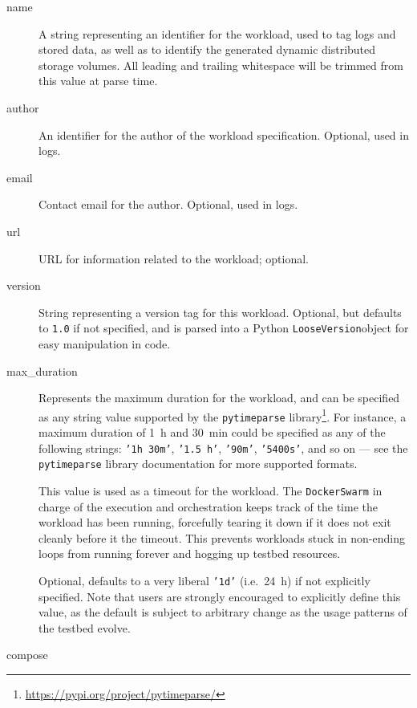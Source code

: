 \begin{description}
    \item[name]
    A string representing an identifier for the workload, used to tag logs and stored data, as well as to identify the generated dynamic distributed storage volumes.
    All leading and trailing whitespace will be trimmed from this value at parse time.
    \item[author]
    An identifier for the author of the workload specification.
    Optional, used in logs.
    \item[email]
    Contact email for the author.
    Optional, used in logs.
    \item[url]
    URL for information related to the workload; optional.
    \item[version]
    String representing a version tag for this workload.
    Optional, but defaults to \texttt{1.0} if not specified, and is parsed into a Python \texttt{LooseVersion}object for easy manipulation in code.
    \item[max\_duration]
    Represents the maximum duration for the workload, and can be specified as any string value supported by the \texttt{pytimeparse} library\footnote{\url{https://pypi.org/project/pytimeparse/}}.
    For instance, a maximum duration of \SI{1}{\hour} and \SI{30}{\minute} could be specified as any of the following strings: \texttt{'1h 30m'}, \texttt{'1.5 h'}, \texttt{'90m'}, \texttt{'5400s'}, and so on --- see the \verb|pytimeparse| library documentation for more supported formats.
    
    This value is used as a timeout for the workload.
    The \texttt{DockerSwarm} in charge of the execution and orchestration keeps track of the time the workload has been running, forcefully tearing it down if it does not exit cleanly before it the timeout.
    This prevents workloads stuck in non-ending loops from running forever and hogging up testbed resources.

    Optional, defaults to a very liberal \texttt{'1d'} (i.e.\ \SI{24}{\hour}) if not explicitly specified.
    Note that users are strongly encouraged to explicitly define this value, as the default is subject to arbitrary change as the usage patterns of the testbed evolve.

    \item[compose]
    

\end{description}
